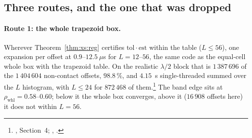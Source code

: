 \subsection{Three routes, and the one that was dropped}
\label{sec:xs:routes}

\paragraph{Route 1: the whole trapezoid box.} Wherever Theorem~\ref{thm:xs:reg} certifies
$\mathrm{tol}\cdot\mathrm{est}$ within the table ($L\le56$), one expansion per offset at
$0.9$--$12.5~\mu$s for $L = 12$--$56$, the same code as the equal-cell whole box with the
trapezoid table. On the realistic $\lambda/2$ block that is $1\,387\,696$ of the
$1\,404\,604$ non-contact offsets, $98.8\,\%$, and $4.15$~s single-threaded summed over the
$L$ histogram, with $L\le24$ for $872\,468$ of them.\footnote{,
Section~4; , .} The band edge sits
at $\rho_{\mathrm{whl}} = 0.58$--$0.60$; below it the whole box converges, above it
($16\,908$ offsets here) it does not within $L = 56$.

